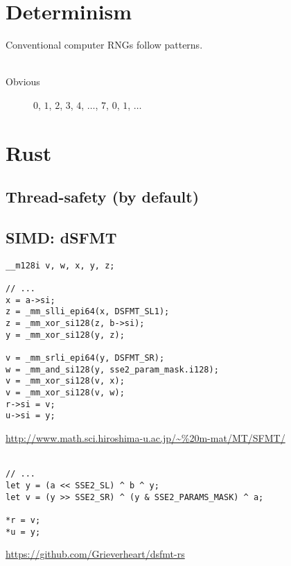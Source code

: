 \documentclass[14pt]{beamer}
\begin{document}
\section{Determinism}
\begin{frame}
  Conventional computer RNGs follow patterns. \\~\\

  \begin{description}
  \item[Obvious] $0$, $1$, $2$, $3$, $4$, $\dotsc$, $7$, $0$, $1$,
    $\dotsc$
  \end{description}
\end{frame}


\section{Rust}

\subsection[Thread-safety]{Thread-safety (by default)}
\begin{frame}

\end{frame}

\subsection{SIMD: dSFMT}
\begin{frame}[fragile]
  \fontsize{8pt}{8pt}\selectfont
  \begin{verbatim}
__m128i v, w, x, y, z;

// ...
x = a->si;
z = _mm_slli_epi64(x, DSFMT_SL1);
z = _mm_xor_si128(z, b->si);
y = _mm_xor_si128(y, z);

v = _mm_srli_epi64(y, DSFMT_SR);
w = _mm_and_si128(y, sse2_param_mask.i128);
v = _mm_xor_si128(v, x);
v = _mm_xor_si128(v, w);
r->si = v;
u->si = y;
  \end{verbatim}

  \begin{flushright}
    \url{http://www.math.sci.hiroshima-u.ac.jp/~%20m-mat/MT/SFMT/}\\~\\
  \end{flushright}
\pause

  \begin{verbatim}
// ...
let y = (a << SSE2_SL) ^ b ^ y;
let v = (y >> SSE2_SR) ^ (y & SSE2_PARAMS_MASK) ^ a;

*r = v;
*u = y;
  \end{verbatim}

  \begin{flushright}
    \url{https://github.com/Grieverheart/dsfmt-rs}
  \end{flushright}
\end{frame}
\end{document}
